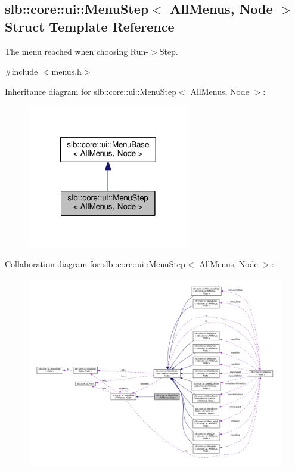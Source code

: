 \hypertarget{structslb_1_1core_1_1ui_1_1MenuStep}{}\subsection{slb\+:\+:core\+:\+:ui\+:\+:Menu\+Step$<$ All\+Menus, Node $>$ Struct Template Reference}
\label{structslb_1_1core_1_1ui_1_1MenuStep}


The menu reached when choosing Run-\/$>$Step.  




{\ttfamily \#include $<$menus.\+h$>$}



Inheritance diagram for slb\+:\+:core\+:\+:ui\+:\+:Menu\+Step$<$ All\+Menus, Node $>$\+:\nopagebreak
\begin{figure}[H]
\begin{center}
\leavevmode
\includegraphics[width=200pt]{structslb_1_1core_1_1ui_1_1MenuStep__inherit__graph}
\end{center}
\end{figure}


Collaboration diagram for slb\+:\+:core\+:\+:ui\+:\+:Menu\+Step$<$ All\+Menus, Node $>$\+:\nopagebreak
\begin{figure}[H]
\begin{center}
\leavevmode
\includegraphics[width=350pt]{structslb_1_1core_1_1ui_1_1MenuStep__coll__graph}
\end{center}
\end{figure}

